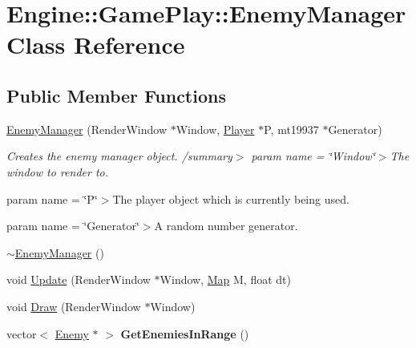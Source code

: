 \hypertarget{class_engine_1_1_game_play_1_1_enemy_manager}{}\section{Engine\+:\+:Game\+Play\+:\+:Enemy\+Manager Class Reference}
\label{class_engine_1_1_game_play_1_1_enemy_manager}
\subsection*{Public Member Functions}
\begin{DoxyCompactItemize}
\item 
\mbox{\label{class_engine_1_1_game_play_1_1_enemy_manager_af20b8cb960acd6a5aabfe6ee5bb9e9e2}} 
\hyperlink{class_engine_1_1_game_play_1_1_enemy_manager_af20b8cb960acd6a5aabfe6ee5bb9e9e2}{Enemy\+Manager} (Render\+Window $\ast$Window, \hyperlink{class_engine_1_1_game_play_1_1_player}{Player} $\ast$P, mt19937 $\ast$Generator)
\begin{DoxyCompactList}\small\item\em Creates the enemy manager object. /summary$>$ param name = \char`\"{}\+Window\char`\"{}$>$The window to render to.

param name = \char`\"{}\+P\char`\"{}$>$The player object which is currently being used.

param name = \char`\"{}\+Generator\char`\"{}$>$A random number generator.\end{DoxyCompactList}\item 
\hyperlink{class_engine_1_1_game_play_1_1_enemy_manager_a503eadcd690205ae495d3761bdfdfcb6}{$\sim$\+Enemy\+Manager} ()
\item 
void \hyperlink{class_engine_1_1_game_play_1_1_enemy_manager_a545df3d86d86905d5db1e4bb8f327137}{Update} (Render\+Window $\ast$Window, \hyperlink{class_engine_1_1_core_1_1_map}{Map} M, float dt)
\item 
void \hyperlink{class_engine_1_1_game_play_1_1_enemy_manager_a8feb401224cac44bec8b2d2c00b0910c}{Draw} (Render\+Window $\ast$Window)
\item 
\mbox{\label{class_engine_1_1_game_play_1_1_enemy_manager_ab6d42b8db3122aee881b71680716c555}} 
vector$<$ \hyperlink{class_engine_1_1_game_play_1_1_enemy}{Enemy} $\ast$ $>$ {\bfseries Get\+Enemies\+In\+Range} ()
\end{DoxyCompactItemize}


